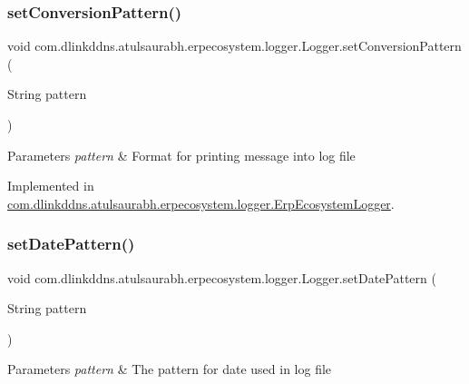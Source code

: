 \subsubsection{\texorpdfstring{set\+Conversion\+Pattern()}{setConversionPattern()}}
{\footnotesize\ttfamily void com.\+dlinkddns.\+atulsaurabh.\+erpecosystem.\+logger.\+Logger.\+set\+Conversion\+Pattern (\begin{DoxyParamCaption}\item[{String}]{pattern }\end{DoxyParamCaption})}


\begin{DoxyParams}{Parameters}
{\em pattern} & Format for printing message into log file \\
\hline
\end{DoxyParams}


Implemented in \mbox{\hyperlink{classcom_1_1dlinkddns_1_1atulsaurabh_1_1erpecosystem_1_1logger_1_1_erp_ecosystem_logger_a16d43ce13e22b9fae1b9e3b55a086b06}{com.\+dlinkddns.\+atulsaurabh.\+erpecosystem.\+logger.\+Erp\+Ecosystem\+Logger}}.

\mbox{\label{interfacecom_1_1dlinkddns_1_1atulsaurabh_1_1erpecosystem_1_1logger_1_1_logger_aceef18a85b09966b1ccf10c9927d0917}} 
\subsubsection{\texorpdfstring{set\+Date\+Pattern()}{setDatePattern()}}
{\footnotesize\ttfamily void com.\+dlinkddns.\+atulsaurabh.\+erpecosystem.\+logger.\+Logger.\+set\+Date\+Pattern (\begin{DoxyParamCaption}\item[{String}]{pattern }\end{DoxyParamCaption})}


\begin{DoxyParams}{Parameters}
{\em pattern} & The pattern for date used in log file \\
\hline
\end{DoxyParams}
\mbox{\label{interfacecom_1_1dlinkddns_1_1atulsaurabh_1_1erpecosystem_1_1logger_1_1_logger_af32bfcb68d536836f7bdb8618e4c1812}} 
